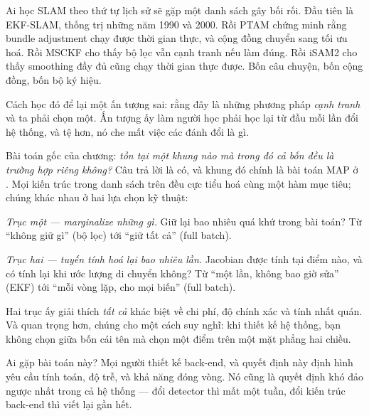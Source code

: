 \documentclass[../../vslam.tex]{subfiles}
\begin{document}
Ai học SLAM theo thứ tự lịch sử sẽ gặp một danh sách gây bối rối. Đầu tiên là EKF-SLAM, thống trị những năm 1990 và 2000. Rồi PTAM \cite{klein2007ptam} chứng minh rằng bundle adjustment chạy được thời gian thực, và cộng đồng chuyển sang tối ưu hoá. Rồi MSCKF \cite{mourikis2007msckf} cho thấy bộ lọc vẫn cạnh tranh nếu làm đúng. Rồi iSAM2 \cite{kaess2012isam2} cho thấy smoothing đầy đủ cũng chạy thời gian thực được. Bốn câu chuyện, bốn cộng đồng, bốn bộ ký hiệu.

Cách học đó để lại một ấn tượng sai: rằng đây là những phương pháp \emph{cạnh tranh} và ta phải chọn một. Ấn tượng ấy làm người học phải học lại từ đầu mỗi lần đổi hệ thống, và tệ hơn, nó che mất việc các đánh đổi là gì.

Bài toán gốc của chương: \emph{tồn tại một khung nào mà trong đó cả bốn đều là trường hợp riêng không?} Câu trả lời là có, và khung đó chính là bài toán MAP ở . Mọi kiến trúc trong danh sách trên đều cực tiểu hoá cùng một hàm mục tiêu; chúng khác nhau ở hai lựa chọn kỹ thuật:

\emph{Trục một --- marginalize những gì.} Giữ lại bao nhiêu quá khứ trong bài toán? Từ ``không giữ gì'' (bộ lọc) tới ``giữ tất cả'' (full batch).

\emph{Trục hai --- tuyến tính hoá lại bao nhiêu lần.} Jacobian được tính tại điểm nào, và có tính lại khi ước lượng di chuyển không? Từ ``một lần, không bao giờ sửa'' (EKF) tới ``mỗi vòng lặp, cho mọi biến'' (full batch).

Hai trục ấy giải thích \emph{tất cả} khác biệt về chi phí, độ chính xác và tính nhất quán. Và quan trọng hơn, chúng cho một cách suy nghĩ: khi thiết kế hệ thống, bạn không chọn giữa bốn cái tên mà chọn một điểm trên một mặt phẳng hai chiều.

Ai gặp bài toán này? Mọi người thiết kế back-end, và quyết định này định hình yêu cầu tính toán, độ trễ, và khả năng đóng vòng. Nó cũng là quyết định khó đảo ngược nhất trong cả hệ thống --- đổi detector thì mất một tuần, đổi kiến trúc back-end thì viết lại gần hết.
\end{document}
